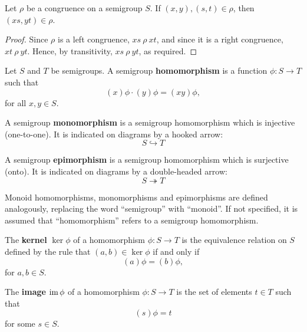 \begin{proposition}
  \label{prop:cong-def}
  Let $\rho$ be a congruence on a semigroup $S$.  If $(x, y), (s, t) \in \rho$,
  then $(xs, yt) \in \rho$.
  \begin{proof}
    Since $\rho$ is a left congruence, $xs ~\rho~ xt$, and since it is a right
    congruence, $xt ~\rho~ yt$.  Hence, by transitivity, $xs ~\rho~ yt$, as
    required.
  \end{proof}
\end{proposition}

\begin{definition}
  \label{def:homomorphism}
  Let $S$ and $T$ be semigroups.  A semigroup \textbf{homomorphism} is a
  function $\phi: S \to T$ such that
  $$(x)\phi \cdot (y)\phi = (xy)\phi,$$
  for all $x, y \in S$.
\end{definition}

\begin{definition}
  \label{def:monomorphism}
  A semigroup \textbf{monomorphism} is a semigroup homomorphism which is
  injective (one-to-one).  It is indicated on diagrams by a hooked arrow:
  $$S \hookrightarrow T$$
\end{definition}

\begin{definition}
  \label{def:epimorphism}
  A semigroup \textbf{epimorphism} is a semigroup homomorphism which is
  surjective (onto).  It is indicated on diagrams by a double-headed arrow:
  $$S \twoheadrightarrow T$$
\end{definition}

Monoid homomorphisms, monomorphisms and epimorphisms are defined analogously,
replacing the word ``semigroup'' with ``monoid''.  If not specified, it is
assumed that ``homomorphism'' refers to a semigroup homomorphism.

\begin{definition}
  The \textbf{kernel} $\ker\phi$ of a homomorphism $\phi:S \to T$ is the
  equivalence relation on $S$ defined by the rule that $(a,b) \in \ker\phi$ if
  and only if
  $$(a)\phi = (b)\phi,$$
  for $a, b \in S$.
\end{definition}

\begin{definition}
  The \textbf{image} $\operatorname{im}\phi$ of a homomorphism $\phi:S \to T$ is the set of
  elements $t \in T$ such that
  $$(s)\phi = t$$
  for some $s \in S$.
\end{definition}

